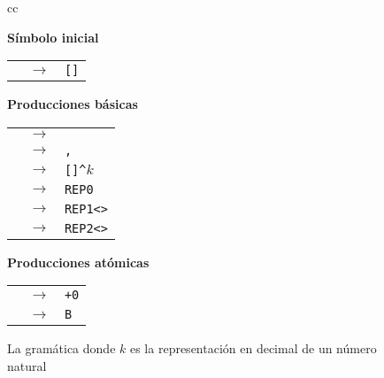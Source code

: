 \begin{figure}
\begin{center}
\begin{tabular}{cc}

    \begin{minipage}[t]{0.35\textwidth}
    {\bf Símbolo inicial}

    \medskip

    \begin{tabular}{rcl}
    \start & $\to$ & \verb#[#\inst\verb#]# %
    \end{tabular}

    \bigskip

    {\bf Producciones básicas}

    \medskip

    \begin{tabular}{rcl}
    \inst  & $\to$ & \atom %
    \\
    \inst  & $\to$ & \inst\verb#,#\inst %
    \\
    \inst  & $\to$ & \rep\verb#[#\inst\verb#]^#$k$%
    \\
    \rep  & $\to$ & \verb#REP0# %
    \\

    \rep  & $\to$ & \verb#REP1<#\atom\verb#># %
    \\
    \rep  & $\to$ & \verb#REP2<#\atom\verb#># %
    \\
    \end{tabular}
    \end{minipage}
    
    \begin{minipage}[t]{0.35\textwidth}

    {\bf Producciones atómicas}

    \medskip

    \begin{tabular}{rcl}    \\
    \atom  & $\to$ & \verb#+0# %
    \\
    \atom  & $\to$ & \verb#B # %
    \end{tabular}
    \end{minipage}
\end{tabular}
\end{center}
\caption{La gramática \grambin donde $k$ es la representación en decimal de un número natural}
\label{fig:grambin}
\end{figure}

